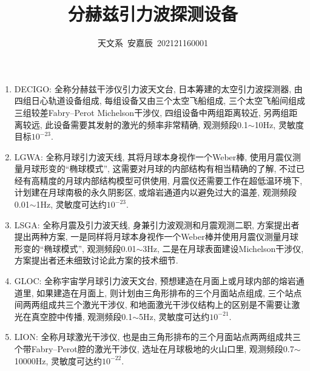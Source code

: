 \documentclass[12pt]{ctexart}
\title{分赫兹引力波探测设备}
\author{天文系\ 安嘉辰\ 202121160001}
\theoremstyle{definition}
\begin{document}
\maketitle
\begin{enumerate}
    \item DECIGO\cite{DECIGO}: 全称分赫兹干涉仪引力波天文台, 日本筹建的太空引力波探测器, 由四组日心轨道设备组成, 每组设备又由三个太空飞船组成, 三个太空飞船间组成三组较差Fabry--Perot Michelson干涉仪, 四组设备中两组距离较近, 另两组距离较远, 此设备需要其发射的激光的频率非常精确, 观测频段0.1$\sim$10Hz, 灵敏度目标$10^{-23}$.
    \item LGWA\cite{LGWA}: 全称月球引力波天线, 其将月球本身视作一个Weber棒, 使用月震仪测量月球形变的``椭球模式'', 这需要对月球的内部结构有相当精确的了解, 不过已经有高精度的月球内部结构模型可供使用, 月震仪还需要工作在超低温环境下, 计划建在月球南极的永久阴影区, 或熔岩通道内以避免过大的温差, 观测频段0.01$\sim$1Hz, 灵敏度可达约$10^{-23}$.
    \item LSGA\cite{LSGA}: 全称月震及引力波天线, 身兼引力波观测和月震观测二职, 方案提出者提出两种方案, 一是同样将月球本身视作一个Weber棒并使用月震仪测量月球形变的``椭球模式'', 观测频段0.01$\sim$3Hz, 二是在月球表面建设Michelson干涉仪, 方案提出者还未细致讨论此方案的技术细节.
    \item GLOC\cite{GLOC}: 全称宇宙学月球引力波天文台, 预想建造在月面上或月球内部的熔岩通道里, 如果建造在月面上, 则计划由三角形排布的三个月面站点组成, 三个站点间两两组成共三个激光干涉仪, 和地面激光干涉仪结构上的区别是不需要让激光在真空腔中传播, 观测频段0.1$\sim$5Hz, 灵敏度可达约$10^{-21}$.
    \item LION\cite{LION}: 全称月球激光干涉仪, 也是由三角形排布的三个月面站点两两组成共三个带Fabry--Perot腔的激光干涉仪, 选址在月球极地的火山口里, 观测频段0.7$\sim$10000Hz, 灵敏度可达约$10^{-22}$.
\end{enumerate}


\end{document}
